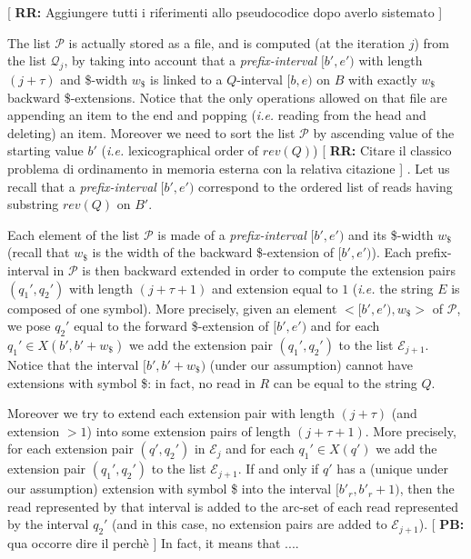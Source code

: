\documentclass[runningheads,envcountsame,a4paper]{llncs}
\newcommand{\notaestesa}[2]{%
 \marginpar{\color{red!75!black}\textbf{\texttimes}}%
 {\color{red!75!black}%
 [\,\textbullet\,\textsf{\textbf{#1:}} %
 \textsf{\footnotesize#2}\,\textbullet\,]}%
}
\newcommand{\ie}{\textit{i.e.}\xspace}
\begin{document}
\notaestesa{RR}{Aggiungere tutti i riferimenti allo pseudocodice dopo averlo sistemato}
The list $\mathcal{P}$ is actually stored as a file, and is computed (at the iteration $j$) from the list $\mathcal{Q}_j$, by
taking into account that a
\emph{prefix-interval} $[b', e')$ with length $(j+\tau)$ and  \$-width $w_\$$ is linked to a $Q$-interval $[b, e)$ on $B$ with exactly $w_\$$ backward \$-extensions.
Notice that the only operations allowed on that file are appending an item to
the end and popping (\ie reading from the head and deleting) an item.
Moreover we need to sort the list $\mathcal{P}$ by ascending value of the starting
value $b'$ (\ie lexicographical order of $rev(Q)$) \notaestesa{RR}{Citare il classico problema di ordinamento in memoria esterna con la relativa citazione}.
Let us recall that a \emph{prefix-interval} $[b', e')$ correspond to
the ordered list of reads having substring $rev(Q)$ on $B'$.

Each element of the list $\mathcal{P}$ is made of a  \emph{prefix-interval} $[b',e')$
and its \$-width $w_\$$ (recall that $w_\$$ is the width of the backward \$-extension of $[b',e')$). %
Each prefix-interval in $\mathcal{P}$ is then backward
extended in order to compute the extension pairs $(q_{1}', q_{2}')$ with
length $(j+\tau+1)$ and extension equal to $1$ (\ie the string $E$ is composed of one symbol).
More precisely, given an element  $<[b',e'), w_\$>$ of $\mathcal{P}$,
we pose $q_{2}'$ equal to the forward \$-extension of  $[b',e')$ and
for each $q_{1}'\in X(b',b'+w_\$)$ we add the extension pair  $(q_{1}',q_{2}')$ to
the list $\mathcal{E}_{j+1}$.
Notice that the interval $[b', b'+w_\$)$ (under our assumption) cannot have
extensions with symbol \$: in fact, no read in $R$ can be equal to the string $Q$.

Moreover we try to extend each extension pair with length $(j+\tau)$ (and extension $>1$) into some
extension pairs of length $(j+\tau+1)$.
More precisely, for each extension pair $(q', q_{2}')$ in  $\mathcal{E}_j$ and
for each $q_{1}'\in X(q')$ we add the extension pair  $(q_{1}',q_{2}')$ to
the list $\mathcal{E}_{j+1}$.
If and only if $q'$ has a (unique under our assumption) extension with symbol \$
into the interval $[b'_r, b'_r+1)$, then the read represented by that
interval is added to the arc-set of each read represented by the
interval $q_{2}'$ (and in this case, no extension pairs are added to $\mathcal{E}_{j+1}$).
\notaestesa{PB}{qua occorre dire il perchè} In fact, it means that ....
\end{document}
